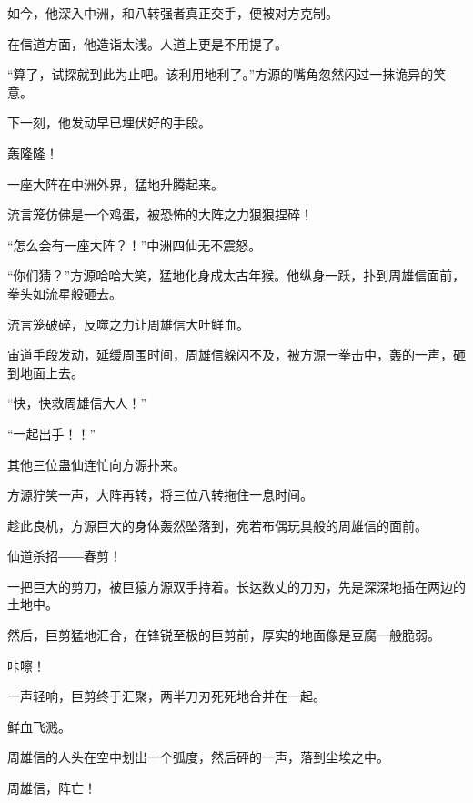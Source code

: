 \begin{this_body}
如今，他深入中洲，和八转强者真正交手，便被对方克制。

在信道方面，他造诣太浅。人道上更是不用提了。

“算了，试探就到此为止吧。该利用地利了。”方源的嘴角忽然闪过一抹诡异的笑意。

下一刻，他发动早已埋伏好的手段。

轰隆隆！

一座大阵在中洲外界，猛地升腾起来。

流言笼仿佛是一个鸡蛋，被恐怖的大阵之力狠狠捏碎！

“怎么会有一座大阵？！”中洲四仙无不震怒。

“你们猜？”方源哈哈大笑，猛地化身成太古年猴。他纵身一跃，扑到周雄信面前，拳头如流星般砸去。

流言笼破碎，反噬之力让周雄信大吐鲜血。

宙道手段发动，延缓周围时间，周雄信躲闪不及，被方源一拳击中，轰的一声，砸到地面上去。

“快，快救周雄信大人！”

“一起出手！！”

其他三位蛊仙连忙向方源扑来。

方源狞笑一声，大阵再转，将三位八转拖住一息时间。

趁此良机，方源巨大的身体轰然坠落到，宛若布偶玩具般的周雄信的面前。

仙道杀招――春剪！

一把巨大的剪刀，被巨猿方源双手持着。长达数丈的刀刃，先是深深地插在两边的土地中。

然后，巨剪猛地汇合，在锋锐至极的巨剪前，厚实的地面像是豆腐一般脆弱。

咔嚓！

一声轻响，巨剪终于汇聚，两半刀刃死死地合并在一起。

鲜血飞溅。

周雄信的人头在空中划出一个弧度，然后砰的一声，落到尘埃之中。

周雄信，阵亡！

\end{this_body}


